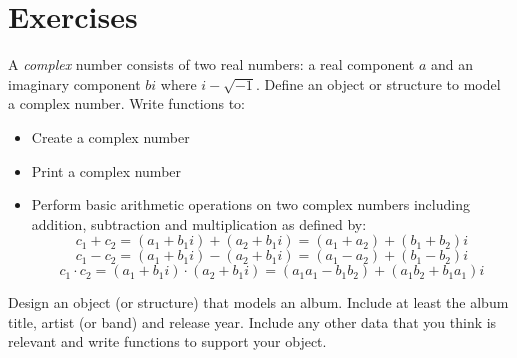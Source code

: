 

\section{Exercises}

\begin{exer}
A \emph{complex} number consists of two real numbers: a real
component $a$ and an imaginary component $bi$ where
$i - \sqrt{-1}$.  Define an object or structure to model a
complex number.  Write functions to:
\begin{itemize}
  \item Create a complex number
  \item Print a complex number
  \item Perform basic arithmetic operations on two complex
  	numbers including addition, subtraction and multiplication 
	as defined by:
	$$c_1 + c_2 = (a_1 + b_1i) + (a_2 + b_1i) = (a_1+a_2) + (b_1+b_2)i$$
	$$c_1 - c_2 = (a_1 + b_1i) - (a_2 + b_1i) = (a_1-a_2) + (b_1-b_2)i$$
	$$c_1 \cdot c_2 = (a_1 + b_1i) \cdot (a_2 + b_1i) = 
	  (a_1a_1-b_1b_2) + (a_1b_2+b_1a_1)i$$
\end{itemize}
\end{exer}

\begin{exer}
Design an object (or structure) that models an album.  Include
at least the album title, artist (or band) and release year.
Include any other data that you think is relevant and write
functions to support your object.
\end{exer}

